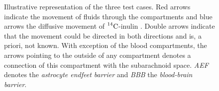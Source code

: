 \documentclass[10pt]{article}
\newcommand{\1}{^{(1)}}
\newcommand{\2}{^{(2)}}
\newcommand{\Cinulin}{$\prescript{14}{}{\text{C}}$-inulin }
\begin{document}
\begin{figure}
\centering
  \caption{Illustrative representation of the three test cases. Red arrows indicate the movement of fluids through the compartments and blue arrows the diffusive movement of \Cinulin. Double arrows indicate that the movement could be directed in both directions and is, a priori, not known. With exception of the blood compartments, the arrows pointing to the outside of any compartment denotes a connection of this compartment with the subarachnoid space. \textit{AEF} denotes the \textit{astrocyte endfeet barrier} and \textit{BBB} the \textit{blood-brain barrier}. }
\label{fig:multi-comp}
\end{figure}










\end{document}

